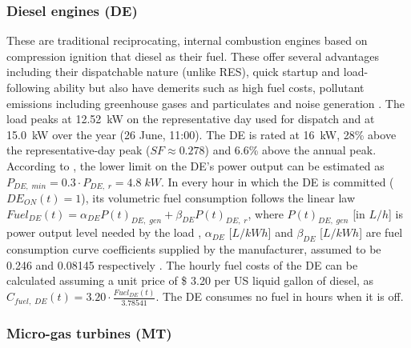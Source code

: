 \documentclass[final,3p,times]{elsarticle}
\begin{document}
\subsubsection{Diesel engines (DE)}

These are traditional reciprocating, internal combustion engines based on compression ignition that diesel as their fuel. These offer several advantages including their dispatchable nature (unlike RES), quick startup and load-following ability but also have demerits such as high fuel costs, pollutant emissions including greenhouse gases and particulates and noise generation \cite{mg_review}. The load peaks at 12.52~kW on the representative day used for dispatch and at 15.0~kW over the year (26 June, 11:00). The DE is rated at 16~kW, 28\% above the representative-day peak ($SF \approx 0.278$) and 6.6\% above the annual peak. According to \cite{fathima2015}, the lower limit on the DE's power output can be estimated as $P_{DE,\;min} = 0.3 \cdot P_{DE,\; r} = 4.8 \; kW$. In every hour in which the DE is committed ($DE_{ON}(t) = 1$), its volumetric fuel consumption follows the linear law $Fuel_{DE}(t) = \alpha_{DE} P(t)_{DE,\;gen} + \beta_{DE} P(t)_{DE,\;r}$, where $P(t)_{DE,\;gen}$ [in $L/h$] is power output level needed by the load \cite{kaabeche2014}, $\alpha_{DE}$ [$L/kWh$] and $\beta_{DE}$ [$L/kWh$] are fuel consumption curve coefficients supplied by the manufacturer, assumed to be 0.246 and 0.08145 respectively \cite{kaabeche2014}. The hourly fuel costs of the DE can be calculated assuming a unit price of \$ 3.20 per US liquid gallon of diesel, as $C_{fuel,\; DE}(t) = 3.20 \cdot \frac{Fuel_{DE}(t)}{3.78541}$. The DE consumes no fuel in hours when it is off.

\subsubsection{Micro-gas turbines (MT)}
\end{document}
